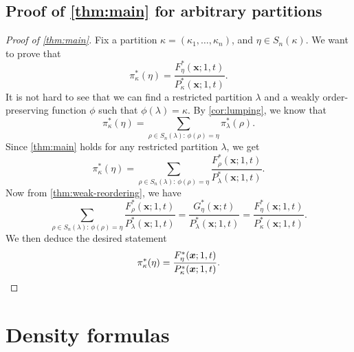 \documentclass[12pt]{amsart}
\theoremstyle{definition}
\newcommand{\bfx}{\boldsymbol{x}}
\begin{document}
\iffalse 
\subsection{Proof of \texorpdfstring{\cref{thm:main}}{the main theorem} for arbitrary partitions}\label{sec:arbitrary}
\begin{proof}[Proof of \cref{thm:main}]
Fix a partition $\kappa=(\kappa_1,\dots,\kappa_n)$, and $\eta\in S_n(\kappa)$.  We want to prove that 
$$\pi_\kappa^*(\eta)=\frac{F^*_\eta(\bfx;1,t)}{P^*_\kappa(\bfx;1,t)}.$$
It is not hard to see that we can find 
a restricted partition $\lambda$ and  
a weakly order-preserving function $\phi$ such that $\phi(\lambda)=\kappa$.
By \cref{cor:lumping}, 
we know that
        $$\pi^*_\kappa(\eta)=\sum_{\rho\in S_n(\lambda):\, \phi(\rho)=\eta}\pi^*_{\lambda}(\rho).$$
Since \cref{thm:main} holds for any restricted partition $\lambda$,
we get
$$\pi^*_\kappa(\eta)=\sum_{\rho\in S_n(\lambda):\, \phi(\rho)=\eta}\frac{F^*_\rho(\bfx;1,t)}{P^*_\lambda(\bfx;1,t)}.$$
Now from \cref{thm:weak-reordering}, we have
$$\sum_{\rho\in S_n(\lambda):\, \phi(\rho)=\eta}\frac{F^*_{\rho}(\bfx;1,t)}{P^*_\lambda(\bfx;1,t)}
=\frac{G^*_{\eta}(\bfx;t)}{P^*_\lambda(\bfx;1,t)}
=\frac{F^*_\eta(\bfx;1,t)}{P^*_\kappa(\bfx;1,t)}.$$
We then deduce the desired statement
\begin{equation*}
  \pi^*_\kappa(\eta)=\frac{F^*_\eta(\bfx;1,t)}{P^*_\kappa(\bfx;1,t)}.\qedhere  
\end{equation*}
\end{proof}

\section{Density formulas}\label{sec:density}
\end{document}
